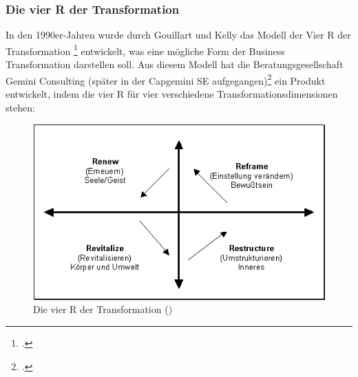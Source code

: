 \subsubsection{Die vier R der Transformation}
In den 1990er-Jahren wurde durch Gouillart und Kelly das Modell der \glqq{}Vier R der Transformation\grqq{} \footcite[Vgl.][]{4r-modell} entwickelt, was eine mögliche Form der Business Transformation darstellen soll. Aus diesem Modell hat die Beratungsgesellschaft Gemini Consulting (später in der Capgemini SE aufgegangen)\footcite[Vgl.][]{gemini-died} ein Produkt entwickelt, indem die vier R für vier verschiedene Transformationsdimensionen stehen:\\
\begin{figure}[h]
    \centering
    \includegraphics[scale=0.5]{Bilder/businesstransformationManagementportal.png}
    \caption[Die vier R der Transformation]{Die vier R der Transformation (\cite[][]{4r-modell})}
\end{figure}
